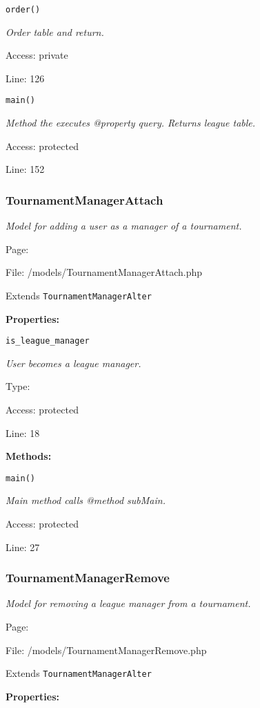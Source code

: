 \texttt{order()}

{\scriptsize
\textit{Order table and return.}

Access: private

Line: 126

}

\texttt{main()}

{\scriptsize
\textit{Method the executes @property query.
Returns league table.}

Access: protected

Line: 152

}

\subsubsection{TournamentManagerAttach}\label{TournamentManagerAttach.php.doc}
\textit{Model for adding a user as a manager of a tournament.}

Page: \pageref{TournamentManagerAttach.php}

File: /models/TournamentManagerAttach.php

Extends \texttt{TournamentManagerAlter}

\textbf{Properties:}

\texttt{is\_league\_manager}

{\scriptsize
\textit{User becomes a league manager.}

Type: 

Access: protected

Line: 18

}
\textbf{Methods:}

\texttt{main()}

{\scriptsize
\textit{Main method calls @method subMain.}

Access: protected

Line: 27

}

\subsubsection{TournamentManagerRemove}\label{TournamentManagerRemove.php.doc}
\textit{Model for removing a league manager from a tournament.}

Page: \pageref{TournamentManagerRemove.php}

File: /models/TournamentManagerRemove.php

Extends \texttt{TournamentManagerAlter}

\textbf{Properties:}

